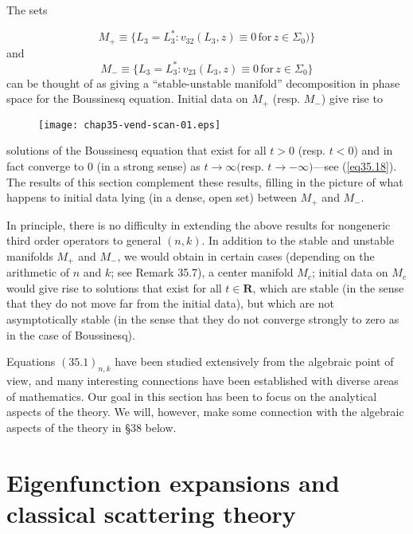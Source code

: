 \documentclass{surv-l}
\theoremstyle{plain}
\theoremstyle{definition}
\numberwithin{equation}{chapter}
\begin{document}
The sets

\begin{equation*}
M_{+}\equiv\{L_{3}=L_{3}^{*}:v_{32} (L_{3}, z)\equiv 0\,\mathrm{for}\, z\in\Sigma_{0})\}
\end{equation*}
and
\begin{equation*}
M_{-}\equiv\{L_{3}=L_{3}^{*}:v_{23} (L_{3}, z)\equiv 0\,\mathrm{for}\, z\in\Sigma_{0}\}
\end{equation*}
can be thought of as giving a ``stable-unstable manifold'' decomposition in phase space for the Boussinesq equation. Initial data on $M_{+}$ (resp. $M_{-}$) give rise to
\begin{figure}
\texttt{[image: chap35-vend-scan-01.eps]}
\caption{}\label{fig15}
\end{figure}
solutions of the Boussinesq equation that exist for all $t>0$ (resp. $t<0$) and in fact converge to $0$ (in a strong sense) as $ t\rightarrow\infty ($resp. $t\rightarrow-\infty)$---see (\ref{eq35.18}). The results of this section complement these results, filling in the picture of what happens to initial data lying (in a dense, open set) between $M_{+}$ and $M_{-}$.

In principle, there is no difficulty in extending the above results for nongeneric third order operators to general $(n, k)$. In addition to the stable and unstable manifolds $M_{+}$ and $M_{-}$, we would obtain in certain cases (depending on the arithmetic of $n$ and $k$; see Remark 35.7), a center manifold $M_{c}$; initial data on $M_{c}$ would give rise to solutions that exist for all $t\in \mathbf{R}$, which are stable (in the sense that they do not move far from the initial data), but which are not asymptotically stable (in the sense that they do not converge strongly to zero as in the case of Boussinesq).

Equations $(35.1)_{n,k}$ have been studied extensively from the algebraic point of view, and many interesting connections have been established with diverse areas of mathematics. Our goal in this section has been to focus on the analytical aspects of the theory. We will, however, make some connection with the algebraic aspects of the theory in \S 38 below.

\section[Eigenfunction Expansions and Classical Scattering Theory]{Eigenfunction expansions and classical scattering theory}\label{sec36}
\end{document}
